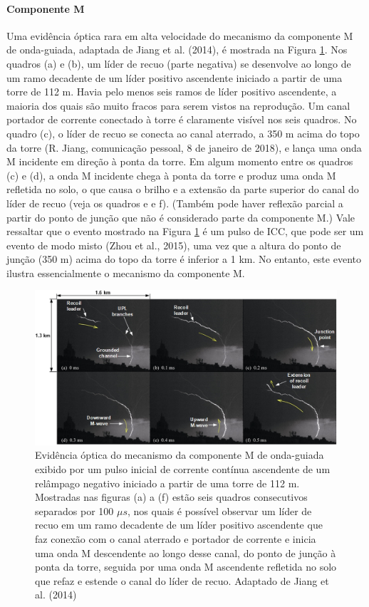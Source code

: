 \documentclass[a4paper, 12pt, onecolumn,singlespacing]{article}
\begin{document}
	\paragraph{Componente M} Uma evidência óptica rara em alta velocidade do mecanismo da componente M de onda-guiada, adaptada de Jiang et al. (2014), é mostrada na Figura \ref{Component_M_explained}\cite{TRAN_2019}. Nos quadros (a) e (b), um líder de recuo (parte negativa) se desenvolve ao longo de um ramo decadente de um líder positivo ascendente iniciado a partir de uma torre de 112 m. Havia pelo menos seis ramos de líder positivo ascendente, a maioria dos quais são muito fracos para serem vistos na reprodução. Um canal portador de corrente conectado à torre é claramente visível nos seis quadros. No quadro (c), o líder de recuo se conecta ao canal aterrado, a 350 m acima do topo da torre (R. Jiang, comunicação pessoal, 8 de janeiro de 2018), e lança uma onda M incidente em direção à ponta da torre. Em algum momento entre os quadros (c) e (d), a onda M incidente chega à ponta da torre e produz uma onda M refletida no solo, o que causa o brilho e a extensão da parte superior do canal do líder de recuo (veja os quadros e e f). (Também pode haver reflexão parcial a partir do ponto de junção que não é considerado parte da componente M.) Vale ressaltar que o evento mostrado na Figura \ref{Component_M_explained} é um pulso de ICC, que pode ser um evento de modo misto (Zhou et al., 2015), uma vez que a altura do ponto de junção (350 m) acima do topo da torre é inferior a 1 km. No entanto, este evento ilustra essencialmente o mecanismo da componente M.
	
	\begin{figure}[!h]
		\centering
		\includegraphics[width=\textwidth]{imagens/processo_componente_m.jpg}
		\caption{Evidência óptica do mecanismo da componente M de onda-guiada exibido por um pulso inicial de corrente contínua ascendente de um relâmpago negativo iniciado a partir de uma torre de 112 m. Mostradas nas figuras (a) a (f) estão seis quadros consecutivos separados por 100 $\mu s$, nos quais é possível observar um líder de recuo em um ramo decadente de um líder positivo ascendente que faz conexão com o canal aterrado e portador de corrente e inicia uma onda M descendente ao longo desse canal, do ponto de junção à ponta da torre, seguida por uma onda M ascendente refletida no solo que refaz e estende o canal do líder de recuo. Adaptado de Jiang et al. (2014)}
		\label{Component_M_explained}
	\end{figure}
	
\end{document}
